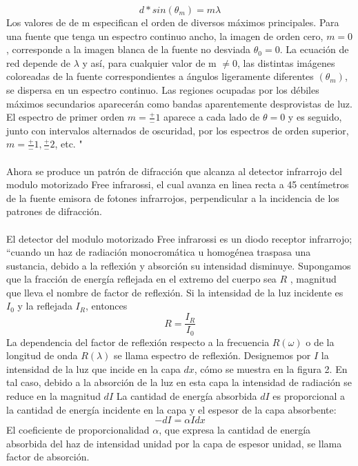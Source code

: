\documentclass[12]{article}
\begin{document}
\begin{multicols}{2}
\begin{equation}
d*sin(\theta _m)= m\lambda 
\end{equation}
Los valores de de m especifican el orden de diversos máximos principales. Para una fuente que tenga un espectro continuo ancho, la imagen de orden cero, $ m = 0 $, corresponde a la imagen blanca de la fuente no desviada $ \theta _0 = 0 $. La ecuación de red depende de $\lambda$ y así, para cualquier valor de m $\ne  0$, las distintas imágenes coloreadas de la fuente correspondientes a ángulos ligeramente diferentes $(\theta _m)$, se dispersa en un espectro continuo. Las regiones ocupadas por los débiles máximos secundarios aparecerán como bandas aparentemente desprovistas de luz. El espectro de primer orden $m = \frac{+}{-}1$ aparece a cada lado de $\theta = 0$ y es seguido, junto con intervalos alternados de oscuridad, por los espectros de orden superior, $m = \frac{+}{-}1, \frac{+}{-}2$, etc. "\cite{OPTICA} \\ \\
Ahora se produce un patrón de difracción que alcanza al detector infrarrojo del modulo motorizado Free infrarossi, el cual avanza en linea recta a 45 centímetros de la fuente emisora de fotones infrarrojos, perpendicular a la incidencia de los patrones de difracción. \\\\
El detector del modulo motorizado Free infrarossi es un diodo receptor infrarrojo; “cuando un haz de radiación monocromática u homogénea traspasa una sustancia, debido a la reflexión y absorción su intensidad disminuye. Supongamos que la fracción de energía reflejada en el extremo del cuerpo sea $R$ , magnitud  que lleva el nombre de factor de reflexión. Si la intensidad de la luz incidente es $I_{0}$ y la reflejada $I_{R}$, entonces 
\begin{equation}
R = \frac{I_{R}}{I_{0}}
\end{equation}
La dependencia del factor de reflexión respecto a la frecuencia $R(\omega)$ o de la longitud de onda $R(\lambda)$ se llama espectro de reflexión.
Designemos por $I$ la intensidad de la luz que incide en la capa $dx$, cómo se muestra en la figura 2. En tal caso, debido a la absorción de la luz en esta capa la intensidad de radiación se reduce en la magnitud $dI$ La cantidad de energía absorbida $dI$ es proporcional a la cantidad de energía incidente   en la capa y el espesor de la capa absorbente:
\begin{equation}
-dI = \alpha I dx
\end{equation}
El coeficiente de proporcionalidad $\alpha$, que expresa la cantidad de energía absorbida del haz de intensidad unidad por la capa de espesor unidad, se llama factor de absorción.

\end{multicols}
\end{document}
